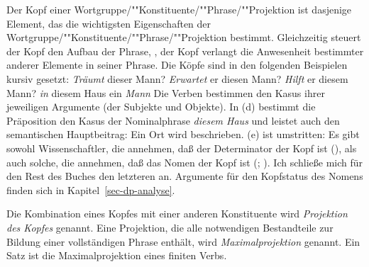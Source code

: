 Der Kopf einer Wortgruppe/""Konstituente/""Phrase/""Projektion ist dasjenige Element,
das die wichtigsten Eigenschaften der Wortgruppe/""Konstituente/""Phrase/""Projektion bestimmt.
Gleichzeitig steuert der Kopf den Aufbau der Phrase, \dash, der Kopf verlangt
die Anwesenheit bestimmter anderer Elemente in seiner Phrase. Die Köpfe sind
in den folgenden Beispielen kursiv gesetzt:
\eal
\ex \emph{Träumt} dieser Mann?
\ex \emph{Erwartet} er diesen Mann?
\ex \emph{Hilft} er diesem Mann?
\ex \emph{in} diesem Haus
\ex ein \emph{Mann}
\zl
Die Verben bestimmen den Kasus ihrer jeweiligen Argumente (der Subjekte und Objekte).
In (d) bestimmt die Präposition den Kasus der Nominalphrase \emph{diesem Haus} und
leistet auch den semantischen Hauptbeitrag: Ein Ort wird beschrieben. (e)
ist umstritten: Es gibt sowohl Wissenschaftler, die annehmen, daß der Determinator
der Kopf ist (\citealp{Hellan86a,Abney87a,Netter94,Netter98a}), als auch solche, die annehmen,
daß das Nomen der Kopf ist (\citealp[]{ps2}; \citealp{Demske2001a}).
Ich schließe mich für den Rest des Buches den letzteren an. Argumente für den Kopfstatus des Nomens
finden sich in Kapitel~\ref{sec-dp-analyse}.

Die Kombination eines Kopfes mit einer anderen Konstituente wird \emph{Projektion
des Kopfes} genannt. Eine Projektion, die alle notwendigen Bestandteile zur Bildung
einer vollständigen Phrase enthält, wird \emph{Maximalprojektion}
genannt. Ein Satz ist die Maximalprojektion eines finiten Verbs.

